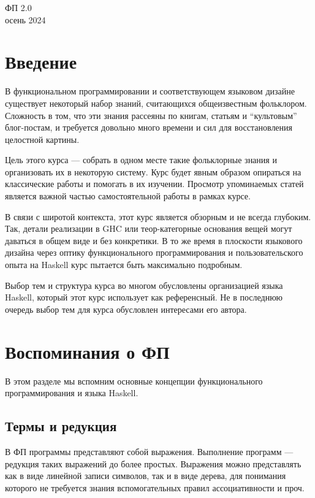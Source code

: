 \documentclass[12pt]{article}
\begin{document}
    \begin{center}
    {\LARGE ФП 2.0}
        \\
        осень 2024
    \end{center}

    \tableofcontents

    \newpage

    \section*{Введение}

    В функциональном программировании и соответствующем языковом дизайне существует некоторый набор знаний, считающихся общеизвестным фольклором.
    Сложность в том, что эти знания рассеяны по книгам, статьям и ``культовым'' блог-постам, и требуется довольно много времени и сил для восстановления целостной картины.

    Цель этого курса --- собрать в одном месте такие фольклорные знания и организовать их в некоторую систему.
    Курс будет явным образом опираться на классические работы и помогать в их изучении.
    Просмотр упоминаемых статей является важной частью самостоятельной работы в рамках курсе.

    В связи с широтой контекста, этот курс является обзорным и не всегда глубоким.
    Так, детали реализации в GHC или теор-категорные основания вещей могут даваться в общем виде и без конкретики.
    В то же время в плоскости языкового дизайна через оптику функционального программирования и пользовательского опыта на Haskell курс пытается быть максимально подробным.

    Выбор тем и структура курса во многом обусловлены организацией языка Haskell, который этот курс использует как референсный.
    Не в последнюю очередь выбор тем для курса обусловлен интересами его автора.


    \section{Воспоминания о ФП}

    В этом разделе мы вспомним основные концепции функционального программирования и языка Haskell.

    \subsection{Термы и редукция}

    В ФП программы представляют собой выражения.
    Выполнение программ --- редукция таких выражений до более простых.
    Выражения можно представлять как в виде линейной записи символов, так и в виде дерева, для понимания которого не требуется знания вспомогательных правил ассоциативности и проч.
\end{document}
